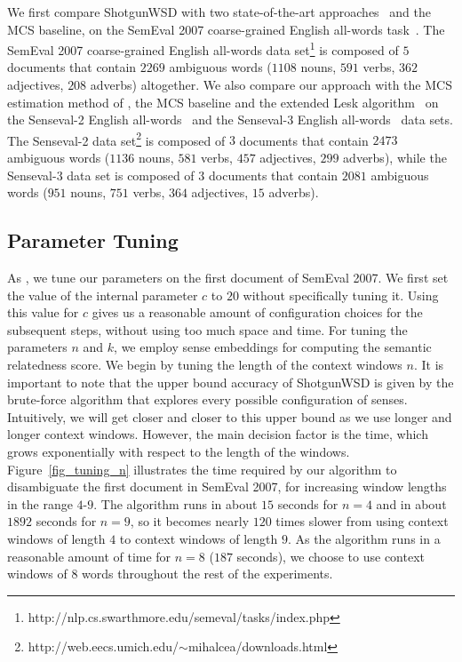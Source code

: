 \documentclass[11pt]{article}
\makeatletter
\newcommand\footnoteref[1]{\protected@xdef\@thefnmark{\ref{#1}}\@footnotemark}
\makeatother
\begin{document}
We first compare ShotgunWSD with two state-of-the-art approaches~\cite{Schwab-WET-2013,Chen-EMNLP-2014} and the MCS baseline, on the SemEval 2007 coarse-grained English all-words task~\cite{SemEval-task7-2007}. The SemEval 2007 coarse-grained English all-words data set\footnote{http://nlp.cs.swarthmore.edu/semeval/tasks/index.php} is composed of $5$ documents that contain $2269$ ambiguous words ($1108$ nouns, $591$ verbs, $362$ adjectives, $208$ adverbs) altogether. We also compare our approach with the MCS estimation method of , the MCS baseline and the extended Lesk algorithm~\cite{Torres-Lesk-2009} on the Senseval-2 English all-words~\cite{Senseval2-2001} and the Senseval-3 English all-words~\cite{Senseval3-2004} data sets. The Senseval-2 data set\footnote{\label{note1}http://web.eecs.umich.edu/$\sim$mihalcea/downloads.html} is composed of $3$ documents that contain $2473$ ambiguous words ($1136$ nouns, $581$ verbs, $457$ adjectives, $299$ adverbs), while the Senseval-3 data set\footnoteref{note1} is composed of $3$ documents that contain $2081$ ambiguous words ($951$ nouns, $751$ verbs, $364$ adjectives, $15$ adverbs).

\subsection{Parameter Tuning}

As , we tune our parameters on the first document of SemEval 2007. We first set the value of the internal parameter $c$ to $20$ without specifically tuning it. Using this value for $c$ gives us a reasonable amount of configuration choices for the subsequent steps, without using too much space and time. For tuning the parameters $n$ and $k$, we employ sense embeddings for computing the semantic relatedness score. We begin by tuning the length of the context windows $n$. It is important to note that the upper bound accuracy of ShotgunWSD is given by the brute-force algorithm that explores every possible configuration of senses. Intuitively, we will get closer and closer to this upper bound as we use longer and longer context windows. However, the main decision factor is the time, which grows exponentially with respect to the length of the windows. Figure~\ref{fig_tuning_n} illustrates the time required by our algorithm to disambiguate the first document in SemEval 2007, for increasing window lengths in the range $4$-$9$. The algorithm runs in about $15$ seconds for $n = 4$ and in about $1892$ seconds for $n = 9$, so it becomes nearly $120$ times slower from using context windows of length $4$ to context windows of length $9$. As the algorithm runs in a reasonable amount of time for $n = 8$ ($187$ seconds), we choose to use context windows of $8$ words throughout the rest of the experiments.
\end{document}

